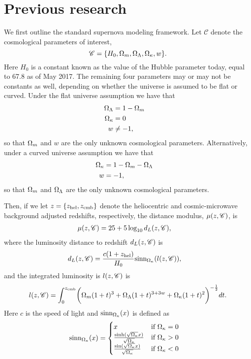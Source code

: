 \section{Previous research}
\label{sec:ode_background}

We first outline the standard supernova modeling framework. Let $\mathcal{C}$ denote the cosmological parameters of interest,
\begin{equation}
\mathcal{C} = \{H_0, \Omega_m, \Omega_\Lambda, \Omega_\kappa, w\}.
\end{equation} 
Here $H_0$ is a constant known as the value of the Hubble parameter today, equal to 67.8 as of May 2017. The remaining four parameters may or may not be constants as well, depending on whether the universe is assumed to be flat or curved. Under the flat universe assumption we have that
\begin{align}
\Omega_\Lambda &= 1 - \Omega_m && \label{eq:flat_univ_assumption} \\\nonumber
\Omega_\kappa &= 0 && \\\nonumber
w &\neq -1,
\end{align} 
so that $\Omega_m$ and $w$ are the only unknown cosmological parameters. Alternatively, under a curved universe assumption we have that 
\begin{align}
\Omega_\kappa &= 1 - \Omega_m - \Omega_\Lambda && \label{eq:curv_univ_assumption} \\\nonumber
w &= -1,
\end{align}
so that $\Omega_m$ and $\Omega_\Lambda$ are the only unknown cosmological parameters. 

Then, if we let $z = \{ z_{\text{hel}}, z_{\text{cmb}}\}$ denote the heliocentric and cosmic-microwave background adjusted redshifts, respectively, the distance modulus, $\mu(z, \mathcal{C})$, is
\begin{align}
\mu(z, \mathcal{C}) &= 25 + 5 \log_{10} d_L(z, \mathcal{C}), \label{eq:dist_mod}
\end{align}
where the luminosity distance to redshift $d_L(z, \mathcal{C})$ is
\begin{align}
d_L(z, \mathcal{C}) &= \frac{c(1 + z_{\text{hel}})}{H_0} \text{sinn}_{\Omega_\kappa}( l(z, \mathcal{C}) ), \label{eq:lum_dist}
\end{align}
and the integrated luminosity is $l(z, \mathcal{C})$ is
\begin{align}
l(z, \mathcal{C}) = \int_0^{z_{\text{cmb}}} \biggl( \Omega_m(1 + t)^3 + \Omega_\Lambda (1 + t)^{3 + 3w} + \Omega_\kappa (1 + t)^2 \biggr)^{-\frac{1}{2}} dt. \label{eq:integrated_lum}
\end{align}
Here $c$ is the speed of light and $\text{sinn}_{\Omega_\kappa}(x)$ is defined as
\begin{align}
\text{sinn}_{\Omega_\kappa}(x) &= 
\begin{cases}
x & \text{if } \Omega_\kappa = 0 \\
\frac{\sinh(\sqrt{\Omega_\kappa}x)}{\sqrt{\Omega_\kappa}} & \text{if } \Omega_\kappa > 0 \\
\frac{\sin(\sqrt{\Omega_\kappa}x)}{\sqrt{\Omega_\kappa}} & \text{if } \Omega_\kappa < 0 
\end{cases} \label{eq:sinn}
\end{align}


